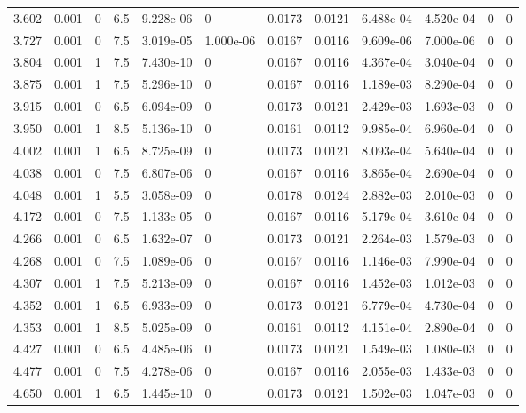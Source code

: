 \documentclass[preview]{standalone}
\begin{document}
{{{\begin{tabular}{L{1.2cm}C{1.2cm} C{0.3cm}C{0.5cm} C{1.4cm}C{1.4cm} C{1.4cm}C{1.4cm} C{1.6cm}C{1.6cm} C{1.6cm}C{1.6cm}}
  3.602  &  0.001  & 0     & 6.5 &  9.228e-06  & 0  &  0.0173&   0.0121& 6.488e-04 & 4.520e-04   &  0 & 0  \\ 
  3.727  &  0.001  & 0     & 7.5 &  3.019e-05  & 1.000e-06  &  0.0167&   0.0116& 9.609e-06 & 7.000e-06   &  0 & 0  \\ 
  3.804  &  0.001  & 1     & 7.5 &  7.430e-10  & 0  &  0.0167&   0.0116& 4.367e-04 & 3.040e-04   &  0 & 0  \\ 
  3.875  &  0.001  & 1     & 7.5 &  5.296e-10  & 0  &  0.0167&   0.0116& 1.189e-03 & 8.290e-04   &  0 & 0  \\ 
  3.915  &  0.001  & 0     & 6.5 &  6.094e-09  & 0  &  0.0173&   0.0121& 2.429e-03 & 1.693e-03   &  0 & 0  \\ 
  3.950  &  0.001  & 1     & 8.5 &  5.136e-10  & 0  &  0.0161&   0.0112& 9.985e-04 & 6.960e-04   &  0 & 0  \\ 
  4.002  &  0.001  & 1     & 6.5 &  8.725e-09  & 0  &  0.0173&   0.0121& 8.093e-04 & 5.640e-04   &  0 & 0  \\ 
  4.038  &  0.001  & 0     & 7.5 &  6.807e-06  & 0  &  0.0167&   0.0116& 3.865e-04 & 2.690e-04   &  0 & 0  \\ 
  4.048  &  0.001  & 1     & 5.5 &  3.058e-09  & 0  &  0.0178&   0.0124& 2.882e-03 & 2.010e-03   &  0 & 0  \\ 
  4.172  &  0.001  & 0     & 7.5 &  1.133e-05  & 0  &  0.0167&   0.0116& 5.179e-04 & 3.610e-04   &  0 & 0  \\ 
  4.266  &  0.001  & 0     & 6.5 &  1.632e-07  & 0  &  0.0173&   0.0121& 2.264e-03 & 1.579e-03   &  0 & 0  \\ 
  4.268  &  0.001  & 0     & 7.5 &  1.089e-06  & 0  &  0.0167&   0.0116& 1.146e-03 & 7.990e-04   &  0 & 0  \\ 
  4.307  &  0.001  & 1     & 7.5 &  5.213e-09  & 0  &  0.0167&   0.0116& 1.452e-03 & 1.012e-03   &  0 & 0  \\ 
  4.352  &  0.001  & 1     & 6.5 &  6.933e-09  & 0  &  0.0173&   0.0121& 6.779e-04 & 4.730e-04   &  0 & 0  \\ 
  4.353  &  0.001  & 1     & 8.5 &  5.025e-09  & 0  &  0.0161&   0.0112& 4.151e-04 & 2.890e-04   &  0 & 0  \\ 
  4.427  &  0.001  & 0     & 6.5 &  4.485e-06  & 0  &  0.0173&   0.0121& 1.549e-03 & 1.080e-03   &  0 & 0  \\ 
  4.477  &  0.001  & 0     & 7.5 &  4.278e-06  & 0  &  0.0167&   0.0116& 2.055e-03 & 1.433e-03   &  0 & 0  \\ 
  4.650  &  0.001  & 1     & 6.5 &  1.445e-10  & 0  &  0.0173&   0.0121& 1.502e-03 & 1.047e-03   &  0 & 0  \\ 

\end{tabular}}}}
\end{document}
